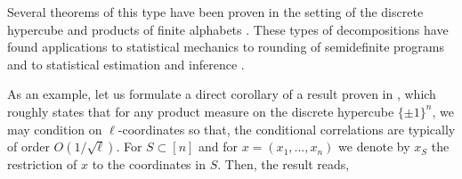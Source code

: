 \documentclass[12pt]{article}
\theoremstyle{definition}
\theoremstyle{remark}
\begin{document}
Several theorems of this type have been proven in the setting of the discrete hypercube and products of finite alphabets \cite{RT12,BCO16,CP17}. These types of decompositions have found applications to statistical mechanics \cite{BCO16,CKPZ16,CP17,JKR18} to rounding of semidefinite programs \cite{RT12,MR17} and to statistical estimation and inference \cite{Montanari2008EstimatingRV,CKPZ16}. 

As an example, let us formulate a direct corollary of a result proven in \cite{RT12}, which roughly states that for any product measure on the discrete hypercube $\{\pm 1 \}^n$, we may condition on $\ell$-coordinates so that, the conditional correlations are typically of order $O(1 / \sqrt{\ell})$. For $S \subset [n]$ and for $x = (x_1,...,x_n)$ we denote by $x_S$ the restriction of $x$ to the coordinates in $S$. Then, the result reads,
\end{document}
